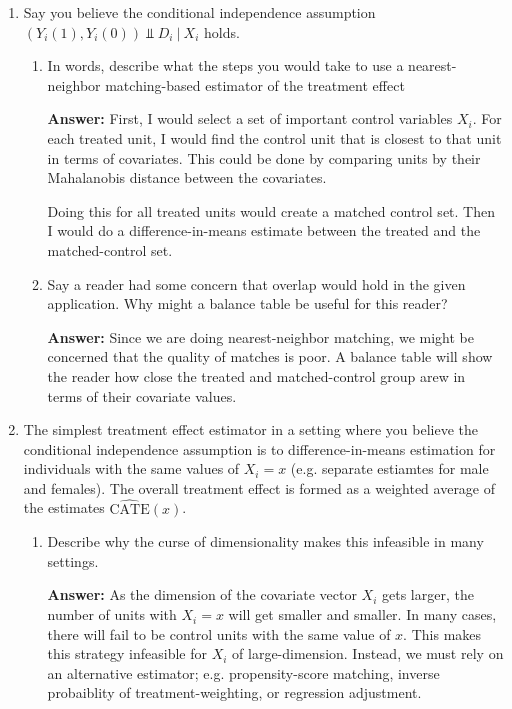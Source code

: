 \documentclass[12pt]{article}
\newcommand{\answer}[1]{{\color{blue_winged_teal}\textbf{Answer:} #1}}
\begin{document}
\begin{enumerate}
  \medskip
  \item Say you believe the conditional independence assumption $(Y_i(1), Y_i(0)) \Perp D_i \ \vert \ X_i$ holds. 
  \begin{enumerate}
    \item In words, describe what the steps you would take to use a nearest-neighbor matching-based estimator of the treatment effect
    
    \answer{
      First, I would select a set of important control variables $X_i$. For each treated unit, I would find the control unit that is closest to that unit in terms of covariates. This could be done by comparing units by their Mahalanobis distance between the covariates. 

      Doing this for all treated units would create a matched control set. Then I would do a difference-in-means estimate between the treated and the matched-control set.
    }
    
    \item Say a reader had some concern that overlap would hold in the given application. Why might a balance table be useful for this reader? 
    
    \answer{
      Since we are doing nearest-neighbor matching, we might be concerned that the quality of matches is poor. A balance table will show the reader how close the treated and matched-control group arew in terms of their covariate values.
    }
  \end{enumerate}
  
  \medskip
  \item The simplest treatment effect estimator in a setting where you believe the conditional independence assumption is to difference-in-means estimation for individuals with the same values of $X_i = x$ (e.g. separate estiamtes for male and females). The overall treatment effect is formed as a weighted average of the estimates $\widehat{\text{CATE}}(x)$.
  \begin{enumerate}
    \item Describe why the curse of dimensionality makes this infeasible in many settings.
    
    \answer{
      As the dimension of the covariate vector $X_i$ gets larger, the number of units with $X_i = x$ will get smaller and smaller. In many cases, there will fail to be control units with the same value of $x$. This makes this strategy infeasible for $X_i$ of large-dimension. Instead, we must rely on an alternative estimator; e.g. propensity-score matching, inverse probaiblity of treatment-weighting, or regression adjustment.
    }
  \end{enumerate}
\end{enumerate}
\end{document}
